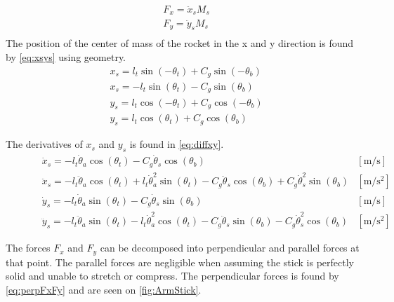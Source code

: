 		\begin{subequations}  \label{eq:FxFy}
			\begin{flalign}
				& F_x=\ddot{x}_sM_s  \\
				& F_y=\ddot{y}_sM_s  \\
			\end{flalign}
		\end{subequations}
		\startexplain
		\stopexplain
		The position of the center of mass of the rocket in the x and y direction is found by \autoref{eq:xsys} using geometry.
		\begin{subequations}\label{eq:xsys} 
			\begin{flalign}
				& x_s=l_t\sin (-\theta_t)+C_g \sin (-\theta_b) \\
				& x_s=-l_t\sin (\theta_t)-C_g \sin (\theta_b) \\
				& y_s = l_t\cos (-\theta_t)+C_g \cos(-\theta_b) \\
				& y_s = l_t\cos (\theta_t)+C_g \cos(\theta_b) 
			\end{flalign}
		\end{subequations}
		
		The derivatives of $x_s$ and $y_s$ is found in \autoref{eq:diffxy}.
		\begin{subequations}\label{eq:diffxy} 
			\begin{flalign}
				\hspace{30pt} & \dot{x}_s=-l_t\dot{\theta}_a\cos(\theta_t)-C_g\dot{\theta}_s\cos(\theta_b) & [\si{\meter\per\second}] \\
				& \ddot{x}_s=-l_t\ddot{\theta}_a\cos(\theta_t)+l_t\dot{\theta}_a^2\sin(\theta_t)-C_g\ddot{\theta}_s\cos(\theta_b)+C_g\dot{\theta}_s^2\sin(\theta_b) & [\si{\meter\per\square\second}] \\
				& \dot{y}_s=-l_t \dot{\theta}_a\sin(\theta_t)-C_g\dot{\theta}_s\sin(\theta_b) & [\si{\meter\per\second}] \\
				& \ddot{y}_s=-l_t\ddot{\theta}_a\sin(\theta_t)-l_t\dot{\theta}_a^2\cos(\theta_t)-C_g\ddot{\theta}_s\sin(\theta_b)-C_g\dot{\theta}_s^2\cos(\theta_b) & [\si{\meter\per\square\second}]
			\end{flalign}
		\end{subequations}
		
		The forces $F_x$ and $F_y$ can be decomposed into perpendicular and parallel forces at that point. The parallel forces are negligible when assuming the stick is perfectly solid and unable to stretch or compress. The perpendicular forces is found by \autoref{eq:perpFxFy} and are seen on \autoref{fig:ArmStick}.
		

